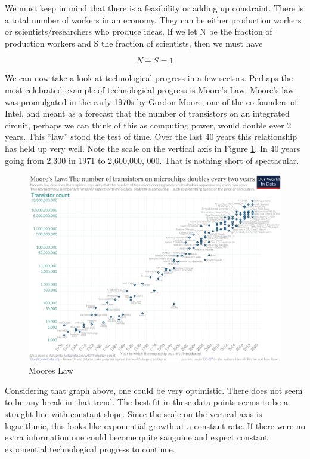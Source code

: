 \documentclass[
]{book}
\begin{document}
We must keep in mind that there is a feasibility or adding up constraint. There is a total number of workers in an economy. They can be either production workers or scientists/researchers who produce ideas. If we let N be the fraction of production workers and S the fraction of scientists, then we must have

\[ N + S = 1 \]

We can now take a look at technological progress in a few sectors. Perhaps the most celebrated example of technological progress is Moore's Law. Moore's law was promulgated in the early 1970s by Gordon Moore, one of the co-founders of Intel, and meant as a forecast that the number of transistors on an integrated circuit, perhaps we can think of this as computing power, would double ever 2 years. This ``law'' stood the test of time. Over the last 40 years this relationship has held up very well. Note the scale on the vertical axis in Figure \ref{fig:fig115}. In 40 years going from 2,300 in 1971 to 2,600,000, 000. That is nothing short of spectacular.

\begin{figure}
\includegraphics[width=1\linewidth]{img/ch1/moore15} \caption{Moores Law}\label{fig:fig115}
\end{figure}

Considering that graph above, one could be very optimistic. There does not seem to be any break in that trend. The best fit in these data points seems to be a straight line with constant slope. Since the scale on the vertical axis is logarithmic, this looks like exponential growth at a constant rate. If there were no extra information one could become quite sanguine and expect constant exponential technological progress to continue.
\end{document}
